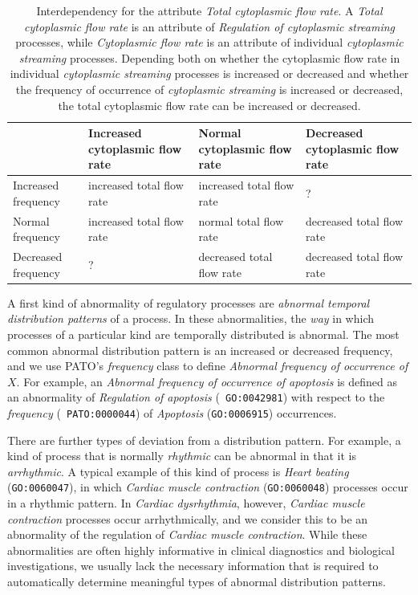 \documentclass[12pt]{article}
\begin{document}
\begin{table}
  \centering
  \begin{tabular}{p{2cm}|p{4cm}|p{4cm}|p{4cm}}
    & Increased cytoplasmic flow rate & Normal cytoplasmic flow rate & Decreased
    cytoplasmic flow rate \\
    \hline
    Increased frequency &increased total flow rate &increased total
    flow rate &?\\
    Normal frequency &increased total flow rate &normal total flow
    rate &decreased total flow rate\\
    Decreased frequency &?&decreased total flow rate &decreased total
    flow rate\\
    \hline
  \end{tabular}
  \caption{\label{tbl:flow}Interdependency for the attribute {\em
      Total cytoplasmic flow rate}. A {\em Total cytoplasmic flow
      rate} is an attribute of {\em Regulation of cytoplasmic
      streaming} processes, while {\em Cytoplasmic flow rate} is an
    attribute of individual {\em cytoplasmic streaming}
    processes. Depending both on whether the cytoplasmic flow rate in
    individual {\em cytoplasmic streaming} processes is increased or
    decreased and whether the frequency of occurrence of {\em
      cytoplasmic streaming} is increased or decreased, the total
    cytoplasmic flow rate can be increased or decreased.}
\end{table}

A first kind of abnormality of regulatory processes are {\em abnormal
  temporal distribution patterns} of a process. In these
abnormalities, the {\em way} in which processes of a particular kind
are temporally distributed is abnormal.  The most common abnormal
distribution pattern is an increased or decreased frequency, and we
use PATO's {\em frequency} class to define {\em Abnormal frequency of
  occurrence of $X$}.
For example, an {\em Abnormal frequency of occurrence of apoptosis} is
defined as an abnormality of {\em Regulation of apoptosis} ({\tt
  GO:0042981}) with respect to the {\em frequency} ({\tt
  PATO:0000044}) of {\em Apoptosis} ({\tt GO:0006915}) occurrences.

There are further types of deviation from a distribution pattern. For
example, a kind of process that is normally {\em rhythmic} can be
abnormal in that it is {\em arrhythmic}. A typical example of this
kind of process is {\em Heart beating} ({\tt GO:0060047}), in which
{\em Cardiac muscle contraction} ({\tt GO:0060048}) processes occur in
a rhythmic pattern. In {\em Cardiac dysrhythmia}, however, {\em
  Cardiac muscle contraction} processes occur arrhythmically, and we
consider this to be an abnormality of the regulation of {\em Cardiac
  muscle contraction}. While these abnormalities are often highly
informative in clinical diagnostics and biological investigations, we
usually lack the necessary information that is required to
automatically determine meaningful types of abnormal distribution
patterns.
\end{document}
